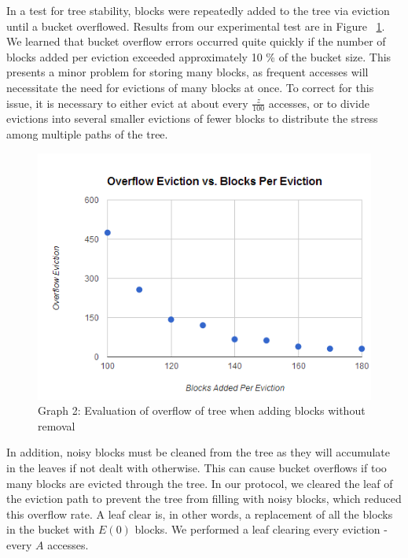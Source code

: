 \documentclass[12pt, oneside]{article}   	%
\begin{document}
In a test for tree stability, blocks were repeatedly added to the tree via eviction until a bucket overflowed. Results from our experimental test are in Figure ~\ref{fig:overflowgraph}. We learned that bucket overflow errors occurred quite quickly if the number of blocks added per eviction exceeded approximately 10 \% of the bucket size. This presents a minor problem for storing many blocks, as frequent accesses will necessitate the need for evictions of many blocks at once. To correct for this issue, it is necessary to either evict at about every $\frac{z}{100}$ accesses, or to divide evictions into several smaller evictions of fewer blocks to distribute the stress among multiple paths of the tree.

\begin{figure}[H]
  \includegraphics[width=\linewidth]{overflowgraph}
  \caption{Graph 2: Evaluation of overflow of tree when adding blocks without removal}
  \label{fig:overflowgraph}
\end{figure}

In addition, noisy blocks must be cleaned from the tree as they will accumulate in the leaves if not dealt with otherwise. This can cause bucket overflows if too many blocks are evicted through the tree. In our protocol, we cleared the leaf of the eviction path to prevent the tree from filling with noisy blocks, which reduced this overflow rate. A leaf clear is, in other words, a replacement of all the blocks in the bucket with $E (0)$ blocks. We performed a leaf clearing every eviction - every $A$ accesses. 
\end{document}
